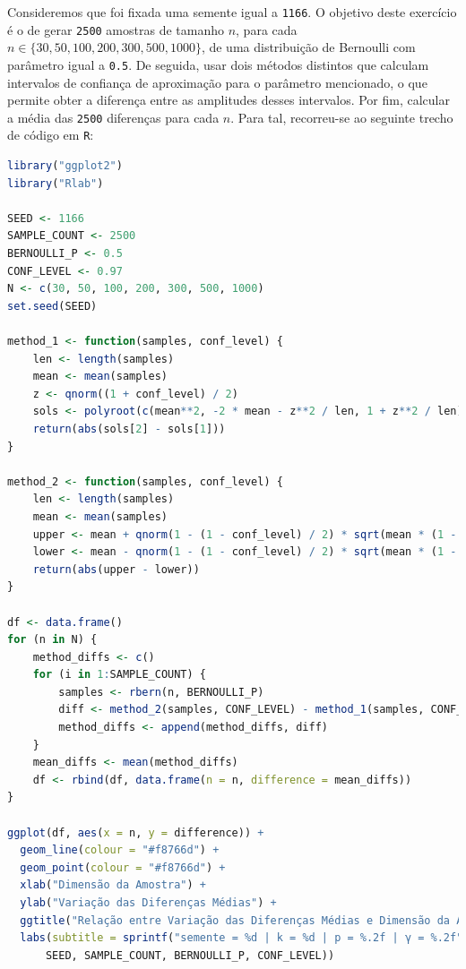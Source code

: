 \documentclass[12pt,a4paper]{article}
\begin{document}
Consideremos que foi fixada uma semente igual a \texttt{1166}.
O objetivo deste exercício é o de gerar \texttt{2500} amostras de tamanho $n$, para cada $ n \in \{30, 50, 100, 200, 300, 500, 1000\}$, de uma distribuição de Bernoulli com parâmetro igual a \texttt{0.5}.
De seguida, usar dois métodos distintos que calculam intervalos de confiança de aproximação para o parâmetro mencionado, o que permite obter a diferença entre as amplitudes desses intervalos.
Por fim, calcular a média das \texttt{2500} diferenças para cada $n$.
Para tal, recorreu-se ao seguinte trecho de código em \texttt{R}:

\quad

\begin{lstlisting}[language=R]
library("ggplot2")
library("Rlab")

SEED <- 1166
SAMPLE_COUNT <- 2500
BERNOULLI_P <- 0.5
CONF_LEVEL <- 0.97
N <- c(30, 50, 100, 200, 300, 500, 1000)
set.seed(SEED)

method_1 <- function(samples, conf_level) {
    len <- length(samples)
    mean <- mean(samples)
    z <- qnorm((1 + conf_level) / 2)
    sols <- polyroot(c(mean**2, -2 * mean - z**2 / len, 1 + z**2 / len))
    return(abs(sols[2] - sols[1]))
}

method_2 <- function(samples, conf_level) {
    len <- length(samples)
    mean <- mean(samples)
    upper <- mean + qnorm(1 - (1 - conf_level) / 2) * sqrt(mean * (1 - mean) / len)
    lower <- mean - qnorm(1 - (1 - conf_level) / 2) * sqrt(mean * (1 - mean) / len)
    return(abs(upper - lower))
}

df <- data.frame()
for (n in N) {
    method_diffs <- c()
    for (i in 1:SAMPLE_COUNT) {
        samples <- rbern(n, BERNOULLI_P)
        diff <- method_2(samples, CONF_LEVEL) - method_1(samples, CONF_LEVEL)
        method_diffs <- append(method_diffs, diff)
    }
    mean_diffs <- mean(method_diffs)
    df <- rbind(df, data.frame(n = n, difference = mean_diffs))
}

ggplot(df, aes(x = n, y = difference)) +
  geom_line(colour = "#f8766d") +
  geom_point(colour = "#f8766d") +
  xlab("Dimensão da Amostra") +
  ylab("Variação das Diferenças Médias") +
  ggtitle("Relação entre Variação das Diferenças Médias e Dimensão da Amostra") +
  labs(subtitle = sprintf("semente = %d | k = %d | p = %.2f | γ = %.2f",
      SEED, SAMPLE_COUNT, BERNOULLI_P, CONF_LEVEL))
\end{lstlisting}
\end{document}

